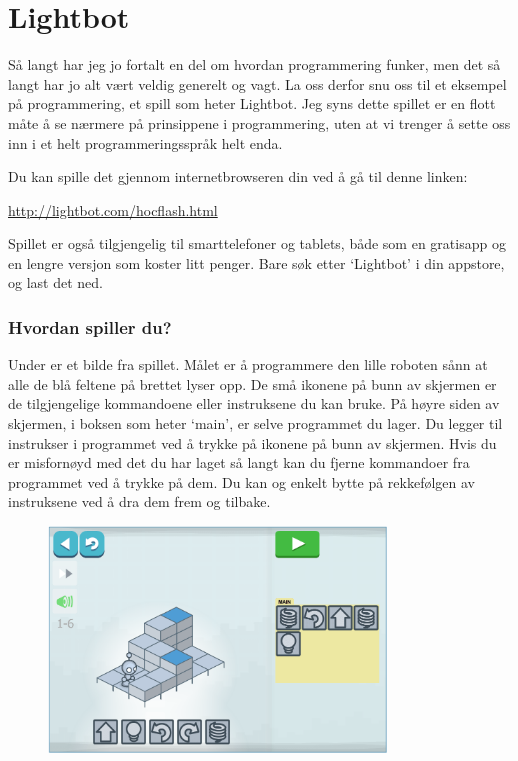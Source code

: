 \documentclass[a4paper, 11pt, notitlepage]{article}
\begin{document}
\clearpage

\section*{Lightbot}

Så langt har jeg jo fortalt en del om hvordan programmering funker, men det så langt har jo alt vært veldig generelt og vagt. La oss derfor snu oss til et eksempel på programmering, et spill som heter Lightbot. Jeg syns dette spillet er en flott måte å se nærmere på prinsippene i programmering, uten at vi trenger å sette oss inn i et helt programmeringsspråk helt enda.

Du kan spille det gjennom internetbrowseren din ved å gå til denne linken:

\url{http://lightbot.com/hocflash.html}

Spillet er også tilgjengelig til smarttelefoner og tablets, både som en gratisapp og en lengre versjon som koster litt penger. Bare søk etter `Lightbot' i din appstore, og last det ned.


\subsubsection*{Hvordan spiller du?}
Under er et bilde fra spillet. Målet er å programmere den lille roboten sånn at alle de blå feltene på brettet lyser opp. De små ikonene på bunn av skjermen er de tilgjengelige kommandoene eller instruksene du kan bruke. På høyre siden av skjermen, i boksen som heter `main',  er selve programmet du lager. Du legger til instrukser i programmet ved å trykke på ikonene på bunn av skjermen. Hvis du er misfornøyd med det du har laget så langt kan du fjerne kommandoer fra programmet ved å trykke på dem.  Du kan og enkelt bytte på rekkefølgen av instruksene ved å dra dem frem og tilbake.

\begin{figure}[h]
\centering
\includegraphics[width=0.8\textwidth]{lightbot1}
\end{figure}
\end{document}
